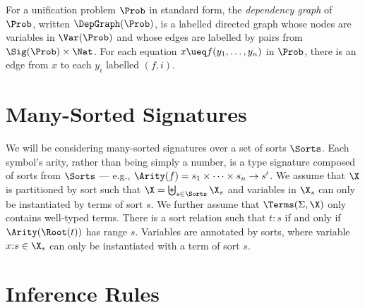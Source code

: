 For a unification problem $\Prob$ in standard form, the \emph{dependency graph}
of $\Prob$, written $\DepGraph(\Prob)$, is a labelled directed graph whose
nodes are variables in $\Var(\Prob)$ and whose edges are labelled by pairs from
$\Sig(\Prob) \times \Nat$.  For each equation $x \ueq f(y_1, \dotsc, y_n)$ in
$\Prob$, there is an edge from $x$ to each $y_i$ labelled $(f, i)$.

\section{Many-Sorted Signatures}\label{sec:sorts}

We will be considering many-sorted signatures over a set of sorts $\Sorts$.
Each symbol's arity, rather than being simply a number, is a type signature
composed of sorts from $\Sorts$ --- e.g., $\Arity(f) = s_1 \times \dotsb \times
s_n \to s'$. We assume that $\X$ is partitioned by sort such that $\X =
\biguplus_{s \in \Sorts} \X_{s}$ and variables in $\X_{s}$ can only be
instantiated by terms of sort $s$. We further assume that $\Terms(\Sigma, \X)$
only contains well-typed terms. There is a sort relation such that $t : s$ if
and only if $\Arity(\Root(t))$ has range $s$. Variables are annotated by sorts,
where variable $x {:} s \in \X_s$ can only be instantiated with a term of sort
$s$.

\section{Inference Rules}\label{sec:inf-rules}

